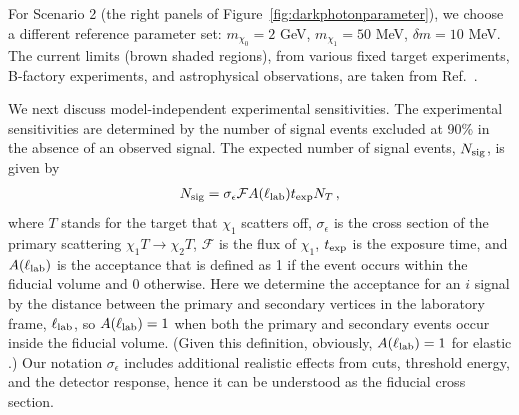 For Scenario 2 (the right panels of Figure~\ref{fig:darkphotonparameter}), we choose a different reference parameter set: $m_{\chi_0} = 2$ GeV, $m_{\chi_1} = 50$ MeV, $\delta m = 10$ MeV. 
The current limits (brown shaded regions), from various fixed target experiments, B-factory experiments, and astrophysical observations, are taken from Ref.~\cite{Banerjee:2018vgk}.


We next discuss model-independent experimental sensitivities. 
The experimental sensitivities are determined by the number of signal events excluded at 90\%  in the absence of an observed signal.
The expected number of signal events, $N_{\rm sig}$, is given by
\begin{align}
N_{\rm sig} = \sigma_\epsilon \mathcal F A(\ell_{\rm lab}) t_{\rm exp} N_T\,,
\label{eq:NS}
\end{align}
where $T$ stands for the target that $\chi_1$ scatters off, $\sigma_\epsilon$ is the cross section of the primary scattering $\chi_1 T \to \chi_2 T$, $\mathcal F$ is the flux of $\chi_1$, $t_{\rm exp}$ is the exposure time, and $A(\ell_{\rm lab})$ is the acceptance that is defined as 1 if the event occurs within the fiducial volume and 0 otherwise.
Here we determine the acceptance for an $i$ signal by the distance between the primary and secondary vertices in the laboratory frame, $\ell_{\rm lab}$, so $A(\ell_{\rm lab}) = 1$ when both the primary and secondary events occur inside the fiducial volume. (Given this definition, obviously, $A(\ell_{\rm lab}) = 1$ for elastic .)
Our notation $\sigma_\epsilon$ includes additional realistic effects from cuts, threshold energy, and the detector response, hence it can be understood as the fiducial cross section.

